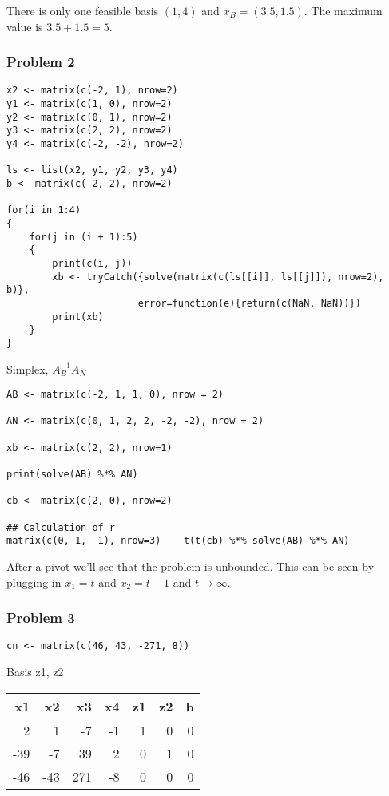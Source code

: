 \documentclass[11pt]{article}
\begin{document}
There is only one feasible basis \((1, 4)\) and \(x_B = (3.5, 1.5)\). The
maximum value is \(3.5 + 1.5 = 5\).
\subsubsection{Problem 2}
\label{sec:orgf503dc0}
\begin{verbatim}
x2 <- matrix(c(-2, 1), nrow=2)
y1 <- matrix(c(1, 0), nrow=2)
y2 <- matrix(c(0, 1), nrow=2)
y3 <- matrix(c(2, 2), nrow=2)
y4 <- matrix(c(-2, -2), nrow=2)

ls <- list(x2, y1, y2, y3, y4)
b <- matrix(c(-2, 2), nrow=2)

for(i in 1:4)
{
    for(j in (i + 1):5)
    {
        print(c(i, j))
        xb <- tryCatch({solve(matrix(c(ls[[i]], ls[[j]]), nrow=2), b)},
                       error=function(e){return(c(NaN, NaN))})
        print(xb)
    }
}
\end{verbatim}

Simplex, \(A_B^{-1}A_N\)

\begin{verbatim}
AB <- matrix(c(-2, 1, 1, 0), nrow = 2)

AN <- matrix(c(0, 1, 2, 2, -2, -2), nrow = 2)

xb <- matrix(c(2, 2), nrow=1)

print(solve(AB) %*% AN)

cb <- matrix(c(2, 0), nrow=2)

## Calculation of r
matrix(c(0, 1, -1), nrow=3) -  t(t(cb) %*% solve(AB) %*% AN)
\end{verbatim}

After a pivot we'll see that the problem is unbounded. This can be seen by
plugging in \(x_1 = t\) and \(x_2 = t +1\) and \(t \rightarrow \infty\).
\subsubsection{Problem 3}
\label{sec:org65ecb06}
\begin{verbatim}
cn <- matrix(c(46, 43, -271, 8))
\end{verbatim}

Basis z1, z2
\begin{center}
\begin{tabular}{rrrrrrr}
x1 & x2 & x3 & x4 & z1 & z2 & b\\
\hline
2 & 1 & -7 & -1 & 1 & 0 & 0\\
-39 & -7 & 39 & 2 & 0 & 1 & 0\\
\hline
-46 & -43 & 271 & -8 & 0 & 0 & 0\\
\end{tabular}
\end{center}
\end{document}
